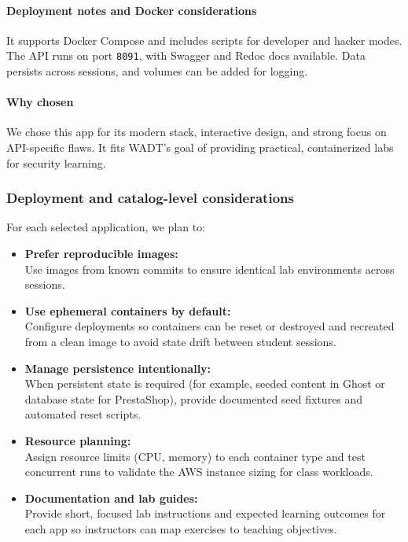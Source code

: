 \documentclass[12pt]{article}
\begin{document}
\paragraph{Deployment notes and Docker considerations}
It supports Docker Compose and includes scripts for developer and hacker modes. The API runs on port \texttt{8091}, with Swagger and Redoc docs available. Data persists across sessions, and volumes can be added for logging.

\paragraph{Why chosen}
We chose this app for its modern stack, interactive design, and strong focus on API-specific flaws. It fits WADT’s goal of providing practical, containerized labs for security learning.

\subsubsection{Deployment and catalog-level considerations}
For each selected application, we plan to:
\begin{itemize}
    \item \textbf{Prefer reproducible images:}\\ Use images from known commits to ensure identical lab environments across sessions.
    \item \textbf{Use ephemeral containers by default:}\\ Configure deployments so containers can be reset or destroyed and recreated from a clean image to avoid state drift between student sessions.
    \item \textbf{Manage persistence intentionally:}\\ When persistent state is required (for example, seeded content in Ghost or database state for PrestaShop), provide documented seed fixtures and automated reset scripts.
    \item \textbf{Resource planning:}\\ Assign resource limits (CPU, memory) to each container type and test concurrent runs to validate the AWS instance sizing for class workloads.
    \item \textbf{Documentation and lab guides:}\\ Provide short, focused lab instructions and expected learning outcomes for each app so instructors can map exercises to teaching objectives.
\end{itemize}
\end{document}
